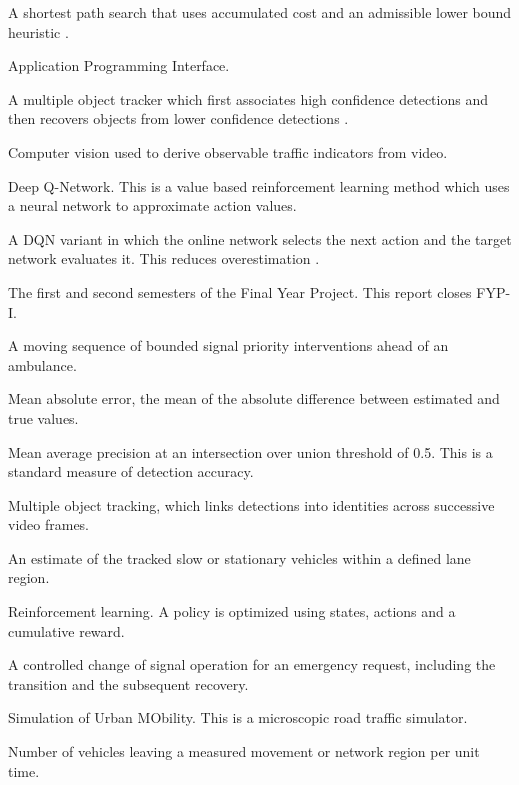 \begin{description}[font=\normalfont,leftmargin=0pt,itemindent=0.45em,labelsep=0.45em,itemsep=0pt,parsep=0pt,topsep=0.25\baselineskip]
\item[A*:] A shortest path search that uses accumulated cost and an admissible lower bound heuristic \cite{hart1968astar}.
\item[API:] Application Programming Interface.
\item[ByteTrack:] A multiple object tracker which first associates high confidence detections and then recovers objects from lower confidence detections \cite{zhang2022bytetrack}.
\item[CV:] Computer vision used to derive observable traffic indicators from video.
\item[DQN:] Deep Q-Network. This is a value based reinforcement learning method which uses a neural network to approximate action values.
\item[Double DQN:] A DQN variant in which the online network selects the next action and the target network evaluates it. This reduces overestimation \cite{vanhasselt2016double}.
\item[FYP-I / FYP-II:] The first and second semesters of the Final Year Project. This report closes FYP-I.
\item[Green corridor:] A moving sequence of bounded signal priority interventions ahead of an ambulance.
\item[MAE:] Mean absolute error, the mean of the absolute difference between estimated and true values.
\item[mAP50:] Mean average precision at an intersection over union threshold of 0.5. This is a standard measure of detection accuracy.
\item[MOT:] Multiple object tracking, which links detections into identities across successive video frames.
\item[Queue proxy:] An estimate of the tracked slow or stationary vehicles within a defined lane region.
\item[RL:] Reinforcement learning. A policy is optimized using states, actions and a cumulative reward.
\item[Signal preemption:] A controlled change of signal operation for an emergency request, including the transition and the subsequent recovery.
\item[SUMO:] Simulation of Urban MObility. This is a microscopic road traffic simulator.
\item[Throughput:] Number of vehicles leaving a measured movement or network region per unit time.

\end{description}
